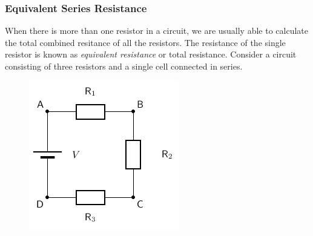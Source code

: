     \addtocounter{footnote}{-0}
    
        \par 

\label{m38776*uid25342}
            \subsubsection{ Equivalent Series Resistance}
            \nopagebreak
            \label{m38776*id63926}When there is more than one resistor in a circuit, we are usually able to calculate the total combined resitance of all the resistors. The resistance of the single resistor is known as \textsl{equivalent resistance} or total resistance.
Consider a circuit consisting of three resistors and a single cell connected in series.\par 
          \label{m38776*id63930}
            
    \setcounter{subfigure}{0}


	\begin{figure}[H] %
    \begin{center}
    \label{m38776*id63934!!!underscore!!!media}\label{m38776*id63934!!!underscore!!!printimage}\includegraphics[width=0.4\columnwidth]{col11305.imgs/m38776_PG11C9_007.png} %
        
      \vspace{2pt}
    \vspace{.1in}
    
    \end{center}

 \end{figure}   

    \addtocounter{footnote}{-0}
    
          \par 
          
